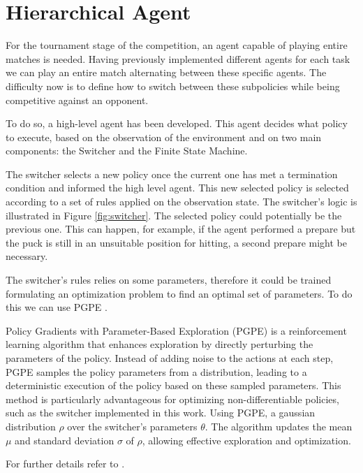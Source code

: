 \section{Hierarchical Agent}
\label{sec:hierarchical_agent}
For the tournament stage of the competition, an agent capable of playing entire matches is needed.
Having previously implemented different agents for each task we can play an entire match alternating between these specific agents.
The difficulty now is to define how to switch between these subpolicies while being competitive against an opponent.

To do so, a high-level agent has been developed. 
This agent decides what policy to execute, based on the observation of the environment and on two main components: the Switcher and the Finite State Machine.

The switcher selects a new policy once the current one has met a termination condition and informed the high level agent.
This new selected policy is selected according to a set of rules applied on the observation state. The switcher's logic is illustrated in Figure \ref{fig:switcher}.
The selected policy could potentially be the previous one. This can happen, for example, if the agent performed a prepare but the
puck is still in an unsuitable position for hitting, a second prepare might be necessary.

The switcher's rules relies on some parameters, therefore it could be trained formulating an optimization problem to find an optimal set of parameters.
To do this we can use PGPE \cite{PGPE}.

Policy Gradients with Parameter-Based Exploration (PGPE) is a reinforcement learning algorithm that enhances exploration by directly perturbing 
the parameters of the policy. Instead of adding noise to the actions at each step, PGPE samples the policy parameters from a distribution, 
leading to a deterministic execution of the policy based on these sampled parameters.
This method is particularly advantageous for optimizing non-differentiable policies, such as the switcher implemented in this work.
Using PGPE, a gaussian distribution $\rho$ over the switcher's parameters $\theta$. 
The algorithm updates the mean $\mu$ and standard deviation $\sigma$ of $\rho$, allowing effective exploration and optimization.

For further details refer to \cite{PGPE}.



